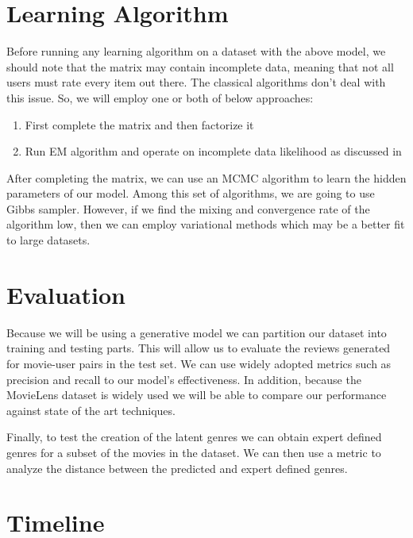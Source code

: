 \documentclass{article} %
\begin{document}
\cite{kermarrec:hal-00673330}

\section{Learning Algorithm}
\label{alg}
Before running any learning algorithm on a dataset with the above model, we 
should note that the matrix may contain incomplete data, meaning that not all 
users must rate every item out there. The classical algorithms don't deal with 
this issue. So, we will employ one or both of below approaches:
\begin{enumerate}
	\item First complete the matrix and then factorize it
	\item Run EM algorithm and operate on incomplete data likelihood as discussed 
	in \cite{Dempster77maximumlikelihood}
\end{enumerate}

After completing the matrix, we can use an MCMC algorithm to learn the hidden 
parameters of our model. Among this set of algorithms, we are going to use Gibbs 
sampler. However, if we find the mixing and convergence rate of the algorithm low, 
then we can employ variational methods which may be a better fit to large 
datasets. 

\section{Evaluation}
\label{eval}
Because we will be using a generative model we can partition our dataset into
training and testing parts. This will allow us to evaluate the reviews generated
for movie-user pairs in the test set. We can use widely adopted metrics such
as precision and recall to our model's effectiveness. In addition, because
the MovieLens dataset is widely used we will be able to compare our performance
against state of the art techniques.

Finally, to test the creation of the latent genres we can obtain expert defined
genres for a subset of the movies in the dataset. We can then use a metric to
analyze the distance between the predicted and expert defined genres.

\section{Timeline}
\label{time}
\end{document}
